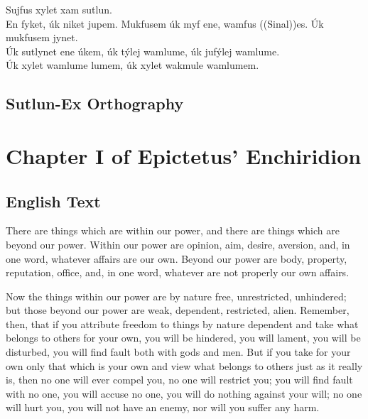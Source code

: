 \documentclass{book}
\begin{document}
    Sujfus xylet xam sutlun. \\
    En fyket, úk niket jupem. Mukfusem úk myf ene, wamfus ((Sinal))es. Úk mukfusem jynet. \\
    Úk sutlynet ene úkem, úk týlej wamlume, úk jufýlej wamlume. \\
    Úk xylet wamlume lumem, úk xylet wakmule wamlumem. \\

\section{Sutlun-Ex Orthography}

\chapter{Chapter I of Epictetus' Enchiridion}
\section{English Text}

    There are things which are within our power, and there are things which are beyond our power.
    Within our power are opinion, aim, desire, aversion, and, in one word, whatever affairs are our own.
    Beyond our power are body, property, reputation, office, and, in one word,
    whatever are not properly our own affairs.

    Now the things within our power are by nature free, unrestricted, unhindered;
    but those beyond our power are weak, dependent, restricted, alien. Remember, then,
    that if you attribute freedom to things by nature dependent and take what belongs to others for your own,
    you will be hindered, you will lament, you will be disturbed, you will find fault both with gods and men.
    But if you take for your own only that which is your own and view what belongs to others just as it really is,
    then no one will ever compel you, no one will restrict you; you will find fault with no one,
    you will accuse no one, you will do nothing against your will; no one will hurt you, you will not have an enemy,
    nor will you suffer any harm.
\end{document}
